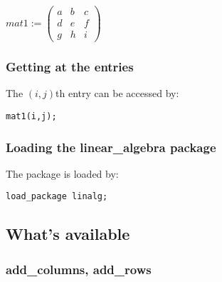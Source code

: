 \begin{flushleft}
\begin{math}
mat1 := \begin{pmatrix} a & b & c \\ d & e & f \\ g & h & i \end{pmatrix}
\end{math}
\end{flushleft}

\subsubsection*{Getting at the entries}

The $(i,j)$th entry can be accessed by:

\texttt{mat1(i,j);}

\subsubsection*{Loading the linear\_algebra package}

The package is loaded by:

\texttt{load\_package linalg;}


\subsection{What's available}

\label{linalg:subsec3}

\subsubsection{add\_columns, add\_rows}
\label{linalg:add_columns}


